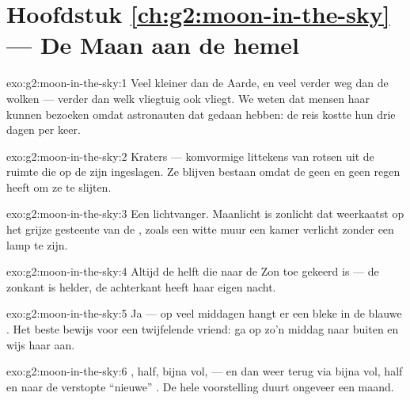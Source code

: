 \section*{Hoofdstuk \ref{ch:g2:moon-in-the-sky} --- De Maan aan de hemel}

\begin{solution}{exo:g2:moon-in-the-sky:1}
Veel kleiner dan de Aarde, en veel verder weg dan de wolken --- verder
dan welk vliegtuig ook vliegt. We weten dat mensen haar kunnen
bezoeken omdat astronauten dat gedaan hebben: de reis kostte hun drie
dagen per keer.
\end{solution}

\begin{solution}{exo:g2:moon-in-the-sky:2}
Kraters --- komvormige littekens van rotsen uit de ruimte die op de
 zijn ingeslagen. Ze blijven bestaan omdat de  geen
 en geen regen heeft om ze te slijten.
\end{solution}

\begin{solution}{exo:g2:moon-in-the-sky:3}
Een lichtvanger. Maanlicht is zonlicht dat weerkaatst op het grijze
gesteente van de , zoals een witte muur een kamer
verlicht zonder een lamp te zijn.
\end{solution}

\begin{solution}{exo:g2:moon-in-the-sky:4}
Altijd de helft die naar de Zon toe gekeerd is --- de zonkant is
helder, de achterkant heeft haar eigen nacht.
\end{solution}

\begin{solution}{exo:g2:moon-in-the-sky:5}
Ja --- op veel middagen hangt er een bleke  in de blauwe .
Het beste bewijs voor een twijfelende vriend: ga op zo'n middag naar
buiten en wijs haar aan.
\end{solution}

\begin{solution}{exo:g2:moon-in-the-sky:6}
, half, bijna vol,  --- en dan weer terug via
bijna vol, half en  naar de verstopte ``nieuwe'' . De
hele voorstelling duurt ongeveer een maand.
\end{solution}


